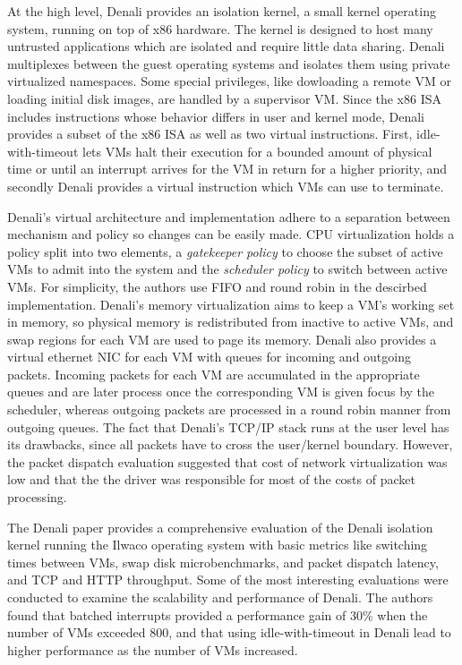 \documentclass[letterpaper, twocolumn]{article}
\begin{document}
At the high level, Denali provides an isolation kernel, a small kernel operating system, running
on top of x86 hardware. The kernel is designed to host many untrusted applications which are isolated
and require little data sharing. Denali multiplexes between the guest operating systems and isolates them
using private virtualized namespaces. Some special privileges, 
like dowloading a remote VM or loading initial disk images, are handled by a supervisor VM.
Since the x86 ISA includes instructions whose behavior differs
in user and kernel mode, Denali provides a subset of the x86 ISA as well as two virtual instructions.
First, idle-with-timeout lets VMs halt their execution for a bounded amount of physical time or until
an interrupt arrives for the VM in return for a higher priority, 
and secondly Denali provides a virtual instruction which VMs can use to terminate.

Denali's virtual architecture and implementation adhere to a separation between mechanism and policy 
so changes can be easily made. CPU virtualization holds a policy split into two elements, 
a \emph{gatekeeper policy} to choose the subset of active VMs to admit into the system and 
the \emph{scheduler policy} to switch between active VMs. For simplicity, the authors use FIFO
and round robin in the descirbed implementation. 
Denali's memory virtualization aims to keep a VM's working set in memory, so physical memory 
is redistributed from inactive to active VMs, and swap regions for each VM are used to page its memory.
Denali also provides a virtual ethernet NIC for each VM with queues for incoming and outgoing packets.
Incoming packets for each VM are accumulated in the appropriate queues and are later process once the
corresponding VM is given focus by the scheduler, whereas outgoing packets are processed in a round robin manner
from outgoing queues. The fact that Denali's TCP/IP stack runs at the user level has its drawbacks, 
since all packets have to cross the user/kernel boundary. However, the packet dispatch evaluation 
suggested that cost of network virtualization was low and that the the driver was responsible for most of the
costs of packet processing.

The Denali paper provides a comprehensive evaluation of the Denali isolation kernel running
the Ilwaco operating system with basic metrics like switching times between VMs, swap disk
microbenchmarks, and packet dispatch latency, and TCP and HTTP throughput. Some of the most
interesting evaluations were conducted to examine the scalability and performance of Denali.
The authors found that batched interrupts provided a performance gain of 30\% when the number
of VMs exceeded 800, and that using idle-with-timeout in Denali lead to higher performance as
the number of VMs increased.
\end{document}
